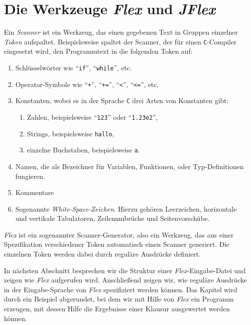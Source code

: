 \chapter{Die Werkzeuge \textsl{Flex}\/ und \textsl{JFlex}}
Ein \emph{Scanner} ist ein Werkzeug, das einen gegebenen Text in Gruppen einzelner
\emph{Token} aufspaltet.  Beispielsweise spaltet der Scanner, der f\"ur einen
\texttt{C}-Compiler eingesetzt wird, den Programmtext in die folgenden Token auf:
\begin{enumerate}
\item Schl\"usselw\"orter wie ``\texttt{if}'', ``\texttt{while}'', etc.
\item Operator-Symbole wie ``\texttt{+}'', ``\texttt{+=}'', ``\texttt{<}'',
      ``\texttt{<=}'', etc.
\item Konstanten, wobei es in der Sprache \texttt{C} drei Arten von Konstanten gibt:
      \begin{enumerate}
      \item Zahlen, beispielsweise ``\texttt{123}'' oder ``\texttt{1.23e2}'',
      \item Strings, beispielsweise \texttt{hallo},
      \item einzelne Buchstaben, beispielsweise \texttt{a}.
      \end{enumerate}
\item Namen, die als Bezeichner f\"ur Variablen, Funktionen, oder Typ-Definitionen
      fungieren.
\item Kommentare
\item Sogenannte \emph{White-Space-Zeichen}.  Hierzu geh\"oren Leerzeichen, horizontale und
      vertikale Tabulatoren, Zeilenumbr\"uche und Seitenvorsch\"ube.
\end{enumerate}
\textsl{Flex}\/ ist ein sogenannter Scanner-Generator, also ein Werkzeug, das aus einer
Spezifikation verschiedener Token automatisch einen Scanner generiert.  Die einzelnen
Token werden dabei durch regul\"are Ausdr\"ucke definiert.  

In n\"achsten Abschnitt besprechen wir die Struktur einer \textsl{Flex}-Eingabe-Datei und
zeigen wie \textsl{Flex}\/ aufgerufen wird.  Anschlie{\ss}end zeigen wir, wie regul\"are Ausdr\"ucke
in der Eingabe-Sprache von \textsl{Flex}\/ spezifiziert werden k\"onnen.  Das Kapitel wird
durch ein Beispiel abgerundet, bei dem wir mit Hilfe von \textsl{Flex}\/ ein Programm
erzeugen, mit dessen Hilfe die Ergebnisse einer Klausur ausgewertet werden k\"onnen.

